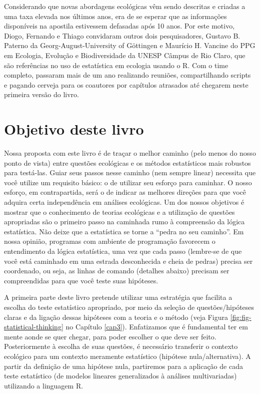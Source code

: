 \documentclass[
]{book}
\begin{document}
Considerando que novas abordagens ecológicas vêm sendo descritas e criadas a uma taxa elevada nos últimos anos, era de se esperar que as informações disponíveis na apostila estivessem defasadas após 10 anos. Por este motivo, Diogo, Fernando e Thiago convidaram outros dois pesquisadores, Gustavo B. Paterno da Georg-August-University of Göttingen e Maurício H. Vancine do PPG em Ecologia, Evolução e Biodiversidade da UNESP Câmpus de Rio Claro, que são referências no uso de estatística em ecologia usando o R. Com o time completo, passaram mais de um ano realizando reuniões, compartilhando scripts e pagando cerveja para os coautores por capítulos atrasados até chegarem neste primeira versão do livro.

\hypertarget{objetivo-deste-livro}{%
\section{Objetivo deste livro}\label{objetivo-deste-livro}}

Nossa proposta com este livro é de traçar o melhor caminho (pelo menos do nosso ponto de vista) entre questões ecológicas e os métodos estatísticos mais robustos para testá-las. Guiar seus passos nesse caminho (nem sempre linear) necessita que você utilize um requisito básico: o de utilizar seu esforço para caminhar. O nosso esforço, em contrapartida, será o de indicar as melhores direções para que você adquira certa independência em análises ecológicas. Um dos nossos objetivos é mostrar que o conhecimento de teorias ecológicas e a utilização de questões apropriadas são o primeiro passo na caminhada rumo à compreensão da lógica estatística. Não deixe que a estatística se torne a ``pedra no seu caminho''. Em nossa opinião, programas com ambiente de programação favorecem o entendimento da lógica estatística, uma vez que cada passo (lembre-se de que você está caminhado em uma estrada desconhecida e cheia de pedras) precisa ser coordenado, ou seja, as linhas de comando (detalhes abaixo) precisam ser compreendidas para que você teste suas hipóteses.

A primeira parte deste livro pretende utilizar uma estratégia que facilita a escolha do teste estatístico apropriado, por meio da seleção de questões/hipóteses claras e da ligação dessas hipóteses com a teoria e o método (veja Figura \ref{fig:fig-statistical-thinking} no Capítulo \ref{cap3}). Enfatizamos que é fundamental ter em mente aonde se quer chegar, para poder escolher o que deve ser feito. Posteriormente à escolha de suas questões, é necessário transferir o contexto ecológico para um contexto meramente estatístico (hipótese nula/alternativa). A partir da definição de uma hipótese nula, partiremos para a aplicação de cada teste estatístico (de modelos lineares generalizados à análises multivariadas) utilizando a linguagem R.
\end{document}
